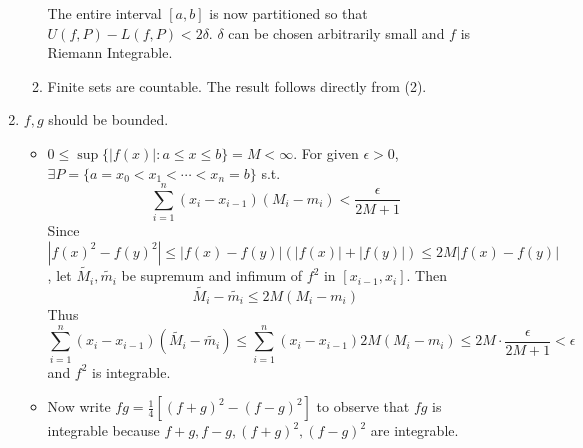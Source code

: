 \documentclass[11pt]{report}
\newcommand{\abs}[1]{\left|#1\right|}
\begin{document}
\begin{enumerate}
\begin{enumerate}
	The entire interval $[a,b]$ is now partitioned so that $U(f, P) - L(f, P) < 2\delta$. $\delta$ can be chosen arbitrarily small and $f$ is Riemann Integrable.	
	
	\item Finite sets are countable. The result follows directly from (2).
\end{enumerate}

\item $f, g$ should be bounded.
\begin{itemize}
	\item $0\leq \sup\{\abs{f(x)}: a \leq x\leq b\} = M < \infty$. For given $\epsilon>0$, $\exists P = \{a = x_0 < x_1 < \cdots < x_n=b\}$ s.t.
	$$\sum_{i=1}^n(x_{i}-x_{i-1})(M_i-m_i) < \frac{\epsilon}{2M+1}$$
	Since $$\abs{f(x)^2 - f(y)^2} \leq \abs{f(x)-f(y)}(\abs{f(x)} + \abs{f(y)}) \leq 2M\abs{f(x)-f(y)}$$
	, let $\tilde{M_i}, \tilde{m_i}$ be supremum and infimum of $f^2$ in $[x_{i-1}, x_i]$. Then $$\tilde{M_i} - \tilde{m_i} \leq 2M(M_i-m_i)$$
	Thus $$ \sum_{i=1}^n(x_{i}-x_{i-1})(\tilde{M_i} - \tilde{m_i}) \leq \sum_{i=1}^n (x_{i} - x_{i-1}) 2M(M_i -m_i) \leq 2M \cdot \frac{\epsilon}{2M+1} < \epsilon $$
	and $f^2$ is integrable.
	\item Now write $fg = \frac{1}{4}[(f+g)^2-(f-g)^2]$ to observe that $fg$ is integrable because $f+g, f-g, (f+g)^2, (f-g)^2$ are integrable.
\end{itemize}
\end{enumerate}
\end{document}
